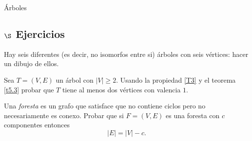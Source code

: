 \begin{section}{Árboles}
\subsection*{$\S$ Ejercicios}\label{ejercicios5.5}
\begin{enumex}
\item \label{ejercicio5.5.1} Hay seis diferentes (es decir, no isomorfos entre si) árboles con
seis vértices: hacer un dibujo de ellos.
\item Sea $T=(V,E)$ un árbol con $|V| \ge 2$. Usando la propiedad \ref{T3} y el teorema \ref{t5.3} probar que $T$ tiene al menos dos vértices con valencia $1$. 
\item Una \textit{foresta} es un grafo que satisface que no contiene ciclos pero no necesariamente es conexo. Probar que si $F=(V,E)$ es una foresta con $c$ componentes entonces
$$
|E|=|V|-c.
$$
\end{enumex}

\end{section}


